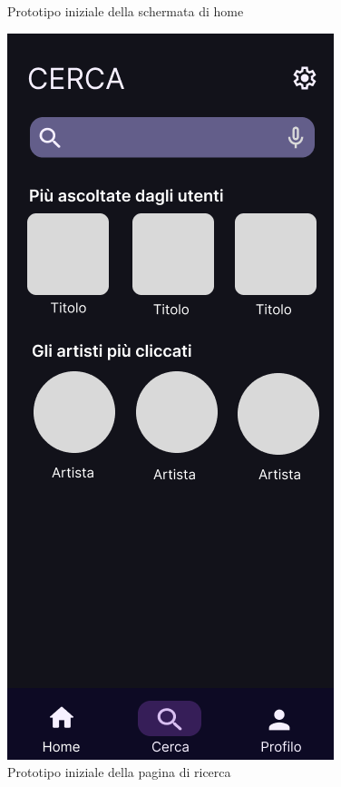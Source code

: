 \documentclass{article}
\begin{document}
\begin{center}
\begin{figure}[htbp]
\begin{minipage}[t]{0.2\textwidth}
					\caption{Prototipo iniziale della schermata di home}
					\label{fig:home_page}
				\end{minipage}%
				\hspace{0.1\textwidth}
				\begin{minipage}[t]{0.2\textwidth}
					\centering
					\includegraphics[width=\textwidth]{Immagini/search_page}
					\caption{Prototipo iniziale della pagina di ricerca}
					\label{fig:search_page}
				\end{minipage}
			\end{figure}
		\end{center}
		\newpage
		
\end{document}
